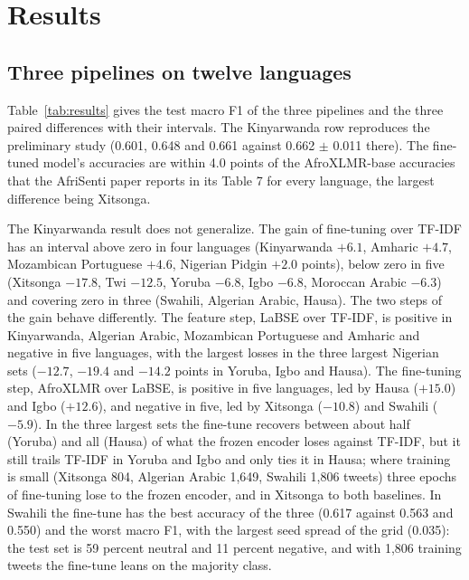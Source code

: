 \documentclass[11pt]{article}
\begin{document}
\section{Results}
\label{sec:results}
\subsection{Three pipelines on twelve languages}
Table~\ref{tab:results} gives the test macro F1 of the three pipelines and the three paired differences with their intervals. The Kinyarwanda row reproduces the preliminary study (0.601, 0.648 and 0.661 against 0.662 $\pm$ 0.011 there). The fine-tuned model's accuracies are within 4.0 points of the AfroXLMR-base accuracies that the AfriSenti paper reports in its Table 7 for every language, the largest difference being Xitsonga.

The Kinyarwanda result does not generalize. The gain of fine-tuning over TF-IDF has an interval above zero in four languages (Kinyarwanda $+6.1$, Amharic $+4.7$, Mozambican Portuguese $+4.6$, Nigerian Pidgin $+2.0$ points), below zero in five (Xitsonga $-17.8$, Twi $-12.5$, Yoruba $-6.8$, Igbo $-6.8$, Moroccan Arabic $-6.3$) and covering zero in three (Swahili, Algerian Arabic, Hausa). The two steps of the gain behave differently. The feature step, LaBSE over TF-IDF, is positive in Kinyarwanda, Algerian Arabic, Mozambican Portuguese and Amharic and negative in five languages, with the largest losses in the three largest Nigerian sets ($-12.7$, $-19.4$ and $-14.2$ points in Yoruba, Igbo and Hausa). The fine-tuning step, AfroXLMR over LaBSE, is positive in five languages, led by Hausa ($+15.0$) and Igbo ($+12.6$), and negative in five, led by Xitsonga ($-10.8$) and Swahili ($-5.9$). In the three largest sets the fine-tune recovers between about half (Yoruba) and all (Hausa) of what the frozen encoder loses against TF-IDF, but it still trails TF-IDF in Yoruba and Igbo and only ties it in Hausa; where training is small (Xitsonga 804, Algerian Arabic 1,649, Swahili 1,806 tweets) three epochs of fine-tuning lose to the frozen encoder, and in Xitsonga to both baselines. In Swahili the fine-tune has the best accuracy of the three (0.617 against 0.563 and 0.550) and the worst macro F1, with the largest seed spread of the grid (0.035): the test set is 59 percent neutral and 11 percent negative, and with 1,806 training tweets the fine-tune leans on the majority class.
\end{document}

